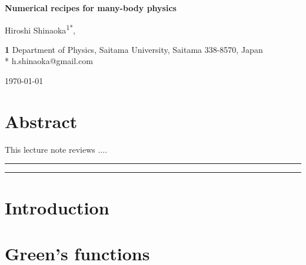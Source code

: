 \documentclass[submission, LectureNotes]{SciPost}
\begin{document}
\begin{center}{\Large \textbf{
    Numerical recipes for many-body physics
}}\end{center}

\begin{center}
Hiroshi Shinaoka\textsuperscript{1*},
\end{center}

\begin{center}
{\bf 1} Department of Physics, Saitama University, Saitama 338-8570, Japan
\\
* h.shinaoka@gmail.com
\end{center}

\begin{center}
\today
\end{center}


\section*{Abstract}
This lecture note reviews ....

\vspace{10pt}
\noindent\rule{\textwidth}{1pt}
\tableofcontents\thispagestyle{fancy}
\noindent\rule{\textwidth}{1pt}
\vspace{10pt}

\section{Introduction}

\clearpage
\section{Green's functions}
\end{document}
